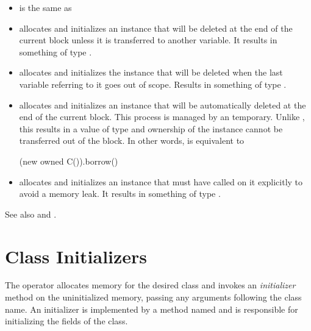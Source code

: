 \begin{itemize}

  \item {} is the same as 

  \item {} allocates and initializes an instance that
    will be deleted at the end of the current block unless it is
    transferred to another  variable. It results in something
    of type .

  \item {} allocates and initializes the instance that
    will be deleted when the last  variable referring to it
    goes out of scope. Results in something of type .

  \item {} allocates and initializes an instance
    that will be automatically deleted at the end of the current block.
    This process is managed by an  temporary.  Unlike
    , this results in a value of type  and ownership of the instance cannot be transferred out of the
    block. In other words,  is equivalent to
    \begin{chapel}
      (new owned C()).borrow()
    \end{chapel}

  \item {} allocates and initializes an instance
    that must have  called on it explicitly to avoid a
    memory leak. It results in something of type .

\end{itemize}

See also  and .

\section{Class Initializers}
\label{Class_Initializers}

The  operator allocates memory for the desired class and invokes
an {\em initializer} method on the uninitialized memory, passing any arguments
following the class name. An initializer is implemented by a method named
 and is responsible for initializing the fields of the class.

